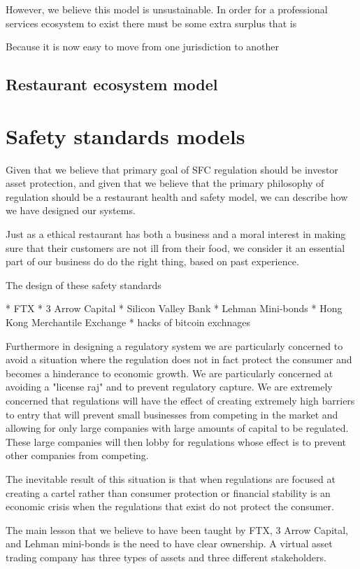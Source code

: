 {However, we believe this model is unsustainable.  In order for a
professional services ecosystem to exist there must be some extra
surplus that is

Because it is now easy to move from one jurisdiction to another

\subsection{Restaurant ecosystem model}

\section{Safety standards models}

Given that we believe that primary goal of SFC regulation should be
investor asset protection, and given that we believe that the primary
philosophy of regulation should be a restaurant health and safety
model, we can describe how we have designed our systems.

Just as a ethical restaurant has both a business and a moral interest
in making sure that their customers are not ill from their food, we
consider it an essential part of our business do do the right thing,
based on past experience.

The design of these safety standards

* FTX
* 3 Arrow Capital
* Silicon Valley Bank
* Lehman Mini-bonds
* Hong Kong Merchantile Exchange
* hacks of bitcoin exchnages

Furthermore in designing a regulatory system we are particularly
concerned to avoid a situation where the regulation does not in fact
protect the consumer and becomes a hinderance to economic growth.  We
are particularly concerned at avoiding a "license raj" and to prevent
regulatory capture.  We are extremely concerned that regulations will
have the effect of creating extremely high barriers to entry that will
prevent small businesses from competing in the market and allowing for
only large companies with large amounts of capital to be regulated.
These large companies will then lobby for regulations whose effect is
to prevent other companies from competing.

The inevitable result of this situation is that when regulations are
focused at creating a cartel rather than consumer protection or
financial stability is an economic crisis when the regulations that
exist do not protect the consumer.

The main lesson that we believe to have been taught by FTX, 3 Arrow
Capital, and Lehman mini-bonds is the need to have clear ownership.  A
virtual asset trading company has three types of assets and three 
different stakeholders.

}
